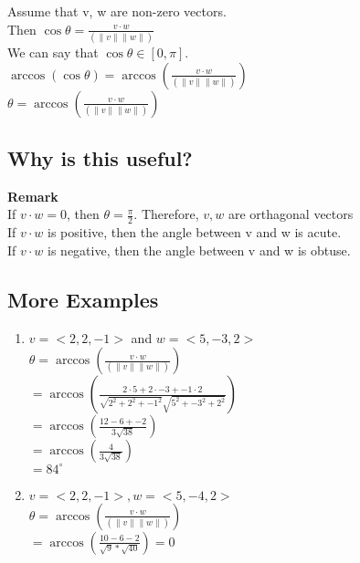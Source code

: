 \documentclass[]{article}
\begin{document}
Assume that v, w are non-zero vectors.\\
Then $\cos\theta = \frac{v\cdot w}{(\|v\|\|w\|)}$\\
We can say that $\cos\theta \in [0, \pi]$.\\
$\arccos(\cos\theta) = \arccos(\frac{v\cdot w}{(\|v\|\|w\|)})$\\
$\theta = \arccos(\frac{v\cdot w}{(\|v\|\|w\|)})$\\
\subsection{Why is this useful?}
\textbf{Remark}\\
If $v \cdot w = 0$, then $\theta = \frac{\pi}{2}$. Therefore, $v, w$ are orthagonal vectors\\
If $v \cdot w$ is positive, then the angle between v and w is acute.\\
If $v \cdot w$ is negative, then the angle between v and w is obtuse.\\

\subsection*{More Examples}
\begin{enumerate}
    \item[] $v = <2, 2, -1>$ and $w = <5, -3, 2>$\\
        $\theta = \arccos(\frac{v\cdot w}{(\|v\|\|w\|)})$\\
        $= \arccos(\frac{2\cdot 5 + 2\cdot -3 + -1\cdot 2}{\sqrt{2^2 + 2^2 + -1^2}\sqrt{5^2 + -3^2 + 2^2}})$\\
        $= \arccos(\frac{12 -6 + -2}{3 \sqrt{38}})$\\
        $= \arccos(\frac{4}{3 \sqrt{38}})$\\
        $= 84^{\circ}$\\
    \item[] $v = <2,2,-1>, w=<5,-4,2>$\\
    $\theta = \arccos(\frac{v\cdot w}{(\|v\|\|w\|)})$\\
    $= \arccos(\frac{10 - 6 - 2}{\sqrt{9}*\sqrt{40}}) = 0$\\
    
\end{enumerate}
\end{document}

